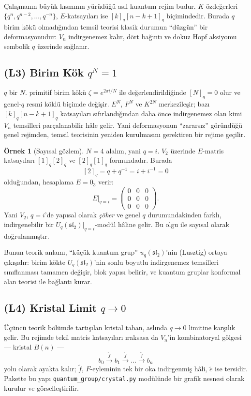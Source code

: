 \documentclass[10pt]{math}
\numberwithin{equation}{section}
\theoremstyle{plain}
\theoremstyle{definition}
\newtheorem{example}[theorem]{Örnek}
\renewcommand{\sl}{\mathfrak{sl}}
\newcommand{\Uq}{U_q(\sl_2)}
\newcommand{\qint}[1]{[#1]_q}
\begin{document}
Çalışmanın büyük kısmının yürüdüğü asıl kuantum rejim budur. $K$-özdeğerleri
$\{q^n, q^{n-2}, \dots, q^{-n}\}$, $E$-katsayıları ise $\qint{k}\qint{n-k+1}$
biçimindedir. Burada $q$ birim kökü olmadığından temsil teorisi klasik durumun
``düzgün'' bir deformasyonudur: $V_n$ indirgenemez kalır, dört bağıntı ve dokuz
Hopf aksiyomu sembolik $q$ üzerinde sağlanır.

\subsection{(L3) Birim Kök $q^N = 1$}

$q$ bir $N$. primitif birim kökü $\zeta = e^{2\pi i/N}$ ile değerlendirildiğinde
$\qint{N}=0$ olur ve genel-$q$ resmi köklü biçimde değişir. $E^N$, $F^N$ ve
$K^{2N}$ merkezîleşir; bazı $\qint{k}\qint{n-k+1}$ katsayıları sıfırlandığından
daha önce indirgenemez olan kimi $V_n$ temsilleri parçalanabilir hâle gelir.
Yani deformasyonun ``zararsız'' göründüğü genel rejimden, temsil teorisinin
yeniden kurulmasını gerektiren bir rejime geçilir.

\begin{example}[Sayısal gözlem]
$N = 4$ alalım, yani $q = i$. $V_2$ üzerinde $E$-matris katsayıları
$\qint{1}\qint{2}$ ve $\qint{2}\qint{1}$ formundadır. Burada
\[
  \qint{2} = q + q^{-1} = i + i^{-1} = 0
\]
olduğundan, hesaplama $E = 0_3$ verir:
\[
  E\big|_{q=i} = \begin{pmatrix} 0 & 0 & 0 \\ 0 & 0 & 0 \\ 0 & 0 & 0 \end{pmatrix}.
\]
Yani $V_2$, $q = i$'de yapısal olarak \emph{çöker} ve genel $q$
durumundakinden farklı, indirgenebilir bir $\Uq|_{q=i}$-modül hâline
gelir. Bu olgu 
ile sayısal olarak doğrulanmıştır.
\end{example}

Bunun teorik anlamı, ``küçük kuantum grup'' $u_q(\sl_2)$'nin (Lusztig)
ortaya çıkışıdır: birim kökte $\Uq$'nin sonlu boyutlu indirgenemez
temsilleri sınıflanması tamamen değişir, blok yapısı belirir, ve kuantum
gruplar konformal alan teorisi ile bağlantı kurar.

\subsection{(L4) Kristal Limit $q \to 0$}

Üçüncü teorik bölümde tartışılan kristal taban, aslında $q\to 0$ limitine
karşılık gelir. Bu rejimde tekil matris katsayıları ıraksasa da $V_n$'in
kombinatoryal gölgesi --- kristal $B(n)$ ---
\[
  b_0 \xrightarrow{\tilde f} b_1 \xrightarrow{\tilde f} \dots
   \xrightarrow{\tilde f} b_n
\]
yolu olarak ayakta kalır; $\tilde f$, $F$-eyleminin tek bir oka indirgenmiş
hâli, $\tilde e$ ise tersidir. Pakette bu yapı \texttt{quantum\_group/crystal.py}
modülünde bir grafik nesnesi olarak kurulur ve görselleştirilir.
\end{document}
